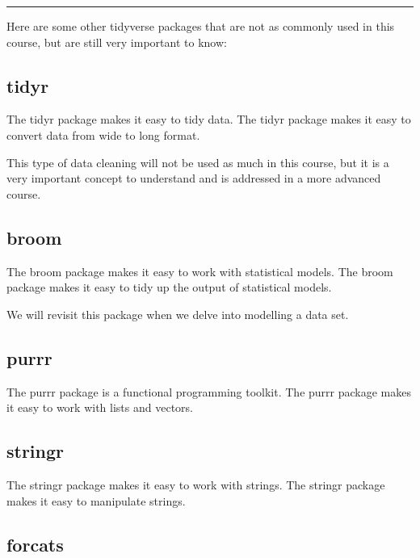 \documentclass[
  letterpaper,
  DIV=11,
  numbers=noendperiod]{scrreprt}
\begin{document}
\begin{center}\rule{0.5\linewidth}{0.5pt}\end{center}

Here are some other tidyverse packages that are not as commonly used in
this course, but are still very important to know:

\subsection*{tidyr}\label{tidyr}

The tidyr package makes it easy to tidy data. The tidyr package makes it
easy to convert data from wide to long format.

This type of data cleaning will not be used as much in this course, but
it is a very important concept to understand and is addressed in a more
advanced course.

\subsection*{broom}\label{broom}

The broom package makes it easy to work with statistical models. The
broom package makes it easy to tidy up the output of statistical models.

We will revisit this package when we delve into modelling a data set.

\subsection*{purrr}\label{purrr}

The purrr package is a functional programming toolkit. The purrr package
makes it easy to work with lists and vectors.

\subsection*{stringr}\label{stringr}

The stringr package makes it easy to work with strings. The stringr
package makes it easy to manipulate strings.

\subsection*{forcats}\label{forcats}
\end{document}
